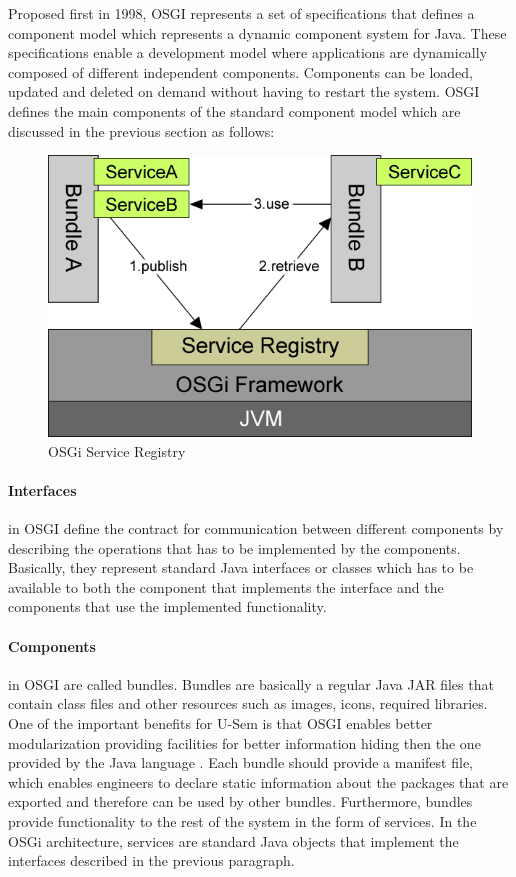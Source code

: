 Proposed first in 1998, OSGI represents a set of specifications that defines a component model which represents a dynamic component system for Java. These specifications enable a development model where applications are dynamically composed of different independent components. Components can be loaded, updated and deleted on demand without having to restart the system. OSGI defines the main components of the standard component model which are discussed in the previous section as follows:

\begin{figure}[h!]
  \centering
  	\includegraphics[scale=0.6]{plug-in/OSGI.png}
  \caption{OSGi Service Registry \cite{Andre}}
  \label{fig_osgi}
\end{figure}

\paragraph{Interfaces}
 in OSGI define the contract for communication between different components by describing the operations that has to be implemented by the components. Basically, they represent standard Java interfaces or classes which has to be available to both the component that implements the interface and the components that use the implemented functionality.


\paragraph{Components}
  in OSGI are called bundles. Bundles are basically a regular Java JAR files that contain class files and other resources such as images, icons, required libraries. One of the important benefits for U-Sem is that OSGI enables better modularization providing facilities for better information hiding then the one provided by the Java language \cite{Andre}. Each bundle should provide a manifest file, which enables engineers to declare static information about the packages that are exported and therefore can be used by other bundles. Furthermore, bundles provide functionality to the rest of the system in the form of services. In the OSGi architecture, services are standard Java objects that implement the interfaces described in the previous paragraph.


